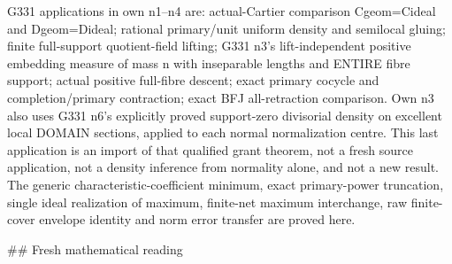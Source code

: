 \documentclass[11pt]{article}
\begin{document}
G331 applications in own n1--n4 are: actual-Cartier comparison Cgeom=Cideal and Dgeom=Dideal; rational primary/unit uniform density and semilocal gluing; finite full-support quotient-field lifting; G331 n3's lift-independent positive embedding measure of mass n with inseparable lengths and ENTIRE fibre support; actual positive full-fibre descent; exact primary cocycle and completion/primary contraction; exact BFJ all-retraction comparison. Own n3 also uses G331 n6's explicitly proved support-zero divisorial density on excellent local DOMAIN sections, applied to each normal normalization centre. This last application is an import of that qualified grant theorem, not a fresh source application, not a density inference from normality alone, and not a new result. The generic characteristic-coefficient minimum, exact primary-power truncation, single ideal realization of maximum, finite-net maximum interchange, raw finite-cover envelope identity and norm error transfer are proved here.

\#\# Fresh mathematical reading
\end{document}
